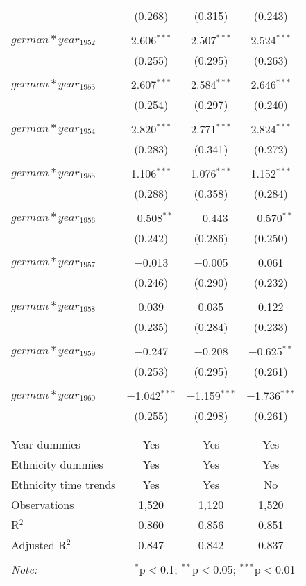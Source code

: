 \begin{table}[!htbp]
\begin{tabular}{@{\extracolsep{5pt}}lccc}
  & (0.268) & (0.315) & (0.243) \\ 
  & & & \\ 
 $german*year_1952$ & 2.606$^{***}$ & 2.507$^{***}$ & 2.524$^{***}$ \\ 
  & (0.255) & (0.295) & (0.263) \\ 
  & & & \\ 
 $german*year_1953$ & 2.607$^{***}$ & 2.584$^{***}$ & 2.646$^{***}$ \\ 
  & (0.254) & (0.297) & (0.240) \\ 
  & & & \\ 
 $german*year_1954$ & 2.820$^{***}$ & 2.771$^{***}$ & 2.824$^{***}$ \\ 
  & (0.283) & (0.341) & (0.272) \\ 
  & & & \\ 
 $german*year_1955$ & 1.106$^{***}$ & 1.076$^{***}$ & 1.152$^{***}$ \\ 
  & (0.288) & (0.358) & (0.284) \\ 
  & & & \\ 
 $german*year_1956$ & $-$0.508$^{**}$ & $-$0.443 & $-$0.570$^{**}$ \\ 
  & (0.242) & (0.286) & (0.250) \\ 
  & & & \\ 
 $german*year_1957$ & $-$0.013 & $-$0.005 & 0.061 \\ 
  & (0.246) & (0.290) & (0.232) \\ 
  & & & \\ 
 $german*year_1958$ & 0.039 & 0.035 & 0.122 \\ 
  & (0.235) & (0.284) & (0.233) \\ 
  & & & \\ 
 $german*year_1959$ & $-$0.247 & $-$0.208 & $-$0.625$^{**}$ \\ 
  & (0.253) & (0.295) & (0.261) \\ 
  & & & \\ 
 $german*year_1960$ & $-$1.042$^{***}$ & $-$1.159$^{***}$ & $-$1.736$^{***}$ \\ 
  & (0.255) & (0.298) & (0.261) \\ 
  & & & \\ 
\hline \\[-1.8ex] 
Year dummies & Yes & Yes & Yes \\ 
Ethnicity dummies & Yes & Yes & Yes \\ 
Ethnicity time trends & Yes & Yes & No \\ 
Observations & 1,520 & 1,120 & 1,520 \\ 
R$^{2}$ & 0.860 & 0.856 & 0.851 \\ 
Adjusted R$^{2}$ & 0.847 & 0.842 & 0.837 \\ 
\hline 
\hline \\[-1.8ex] 
\textit{Note:}  & \multicolumn{3}{r}{$^{*}$p$<$0.1; $^{**}$p$<$0.05; $^{***}$p$<$0.01} \\ 
\end{tabular} 
\end{table} 
